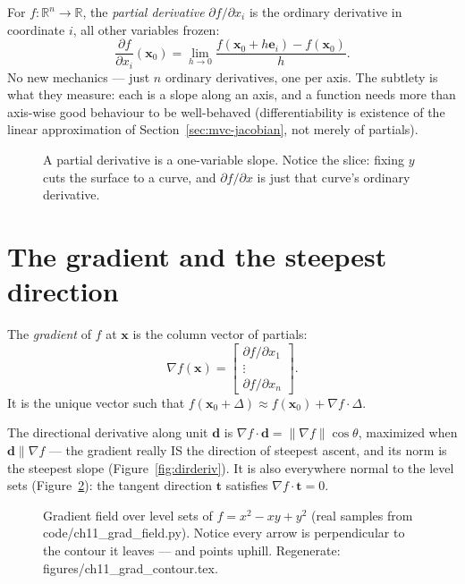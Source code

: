 For $f:\mathbb R^{n}\to\mathbb R$, the \emph{partial
derivative} $\partial f/\partial x_i$ is the
ordinary derivative in coordinate $i$, all other variables frozen:
\[
\frac{\partial f}{\partial x_i}(\mathbf x_0)=\lim_{h\to0}
\frac{f(\mathbf x_0+h\mathbf e_i)-f(\mathbf x_0)}{h}.
\]
No new mechanics --- just $n$ ordinary derivatives, one per axis. The
subtlety is what they measure: each is a slope along an axis, and a
function needs more than axis-wise good behaviour to be well-behaved
(differentiability is existence of the linear approximation of
Section~\ref{sec:mvc-jacobian}, not merely of partials).

\begin{figure}[htbp]\centering

\caption{A partial derivative is a one-variable slope. Notice the
slice: fixing $y$ cuts the surface to a curve, and
$\partial f/\partial x$ is just that curve's ordinary derivative.}
\label{fig:slice}
\end{figure}

\section{The gradient and the steepest direction}\label{sec:mvc-grad}

\begin{definition}[Gradient]
The \emph{gradient} of $f$ at $\mathbf x$ is the column vector of
partials:
\[
\nabla f(\mathbf x)=\begin{bmatrix}\partial f/\partial x_1\\ \vdots\\
\partial f/\partial x_n\end{bmatrix}.
\]
It is the unique vector such that
$f(\mathbf x_0+\Delta)\approx f(\mathbf x_0)+\nabla f\cdot\Delta$.
\end{definition}

The directional derivative along unit
$\mathbf d$ is $\nabla f\cdot\mathbf d=\lVert\nabla f\rVert\cos\theta$,
maximized when $\mathbf d\parallel\nabla f$ --- the gradient really IS
the direction of steepest ascent, and its norm is the steepest slope
(Figure~\ref{fig:dirderiv}). It is also everywhere normal to the level
sets (Figure~\ref{fig:gradcontour}): the tangent direction $\mathbf t$
satisfies $\nabla f\cdot\mathbf t=0$.

\begin{figure}[htbp]
\centering

\caption{Gradient field over level sets of $f=x^{2}-xy+y^{2}$ (real
samples from \ttfamily code/ch11\_grad\_field.py). Notice every arrow is
perpendicular to the contour it leaves --- and points uphill.
Regenerate: \ttfamily figures/ch11\_grad\_contour.tex.}
\label{fig:gradcontour}
\end{figure}

